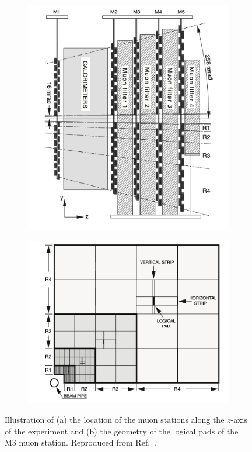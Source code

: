 \begin{figure}[tb]
    \centering
\begin{subfigure}{0.45\columnwidth}
    \includegraphics[width=\columnwidth]{figures/detector/muon_stations.png}
    \caption{}
    \label{fig:muon_stations}
\end{subfigure}
\begin{subfigure}{0.45\columnwidth}
    \includegraphics[width=\columnwidth]{figures/detector/muon_pad.png}
    \caption{}
    \label{fig:muon_pad}
\end{subfigure}
    \caption{Illustration of (a) the location of the muon stations along the $z$-axis of the experiment and (b) the geometry of the logical pads of the M3 muon station. Reproduced from Ref.~\cite{LHCb-Performance}.}
\end{figure}

